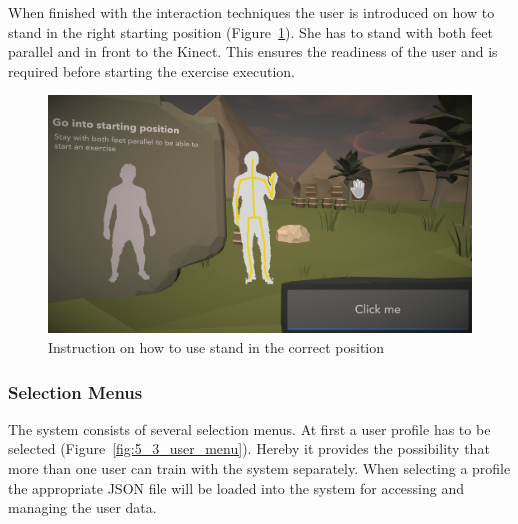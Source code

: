 When finished with the interaction techniques the user is introduced on how to stand in the right starting position (Figure~\ref{fig:5_3_standingPosition}). She has to stand with both feet parallel and in front to the Kinect. This ensures the readiness of the user and is required before starting the exercise execution.
\begin{figure}[htb]
	\centering
	\includegraphics[width=0.5\linewidth]{Pictures/5_Workflow/4_2_StartingPosition}
	\caption{Instruction on how to use stand in the correct position}
	\label{fig:5_3_standingPosition}
\end{figure}

\subsubsection{Selection Menus}
The system consists of several selection menus. At first a user profile has to be selected (Figure~\ref{fig:5_3_user_menu}). Hereby it provides the possibility that more than one user can train with the system separately.
When selecting a profile the appropriate JSON file will be loaded into the system for accessing and managing the user data.

